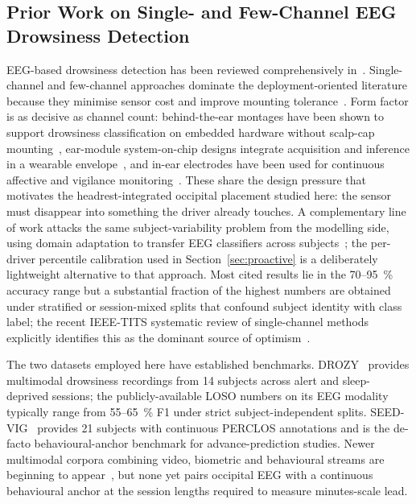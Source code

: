 \documentclass[journal]{IEEEtran}
\DeclareRobustCommand{\add}[1]{#1}                         %
\DeclareRobustCommand{\add}[1]{\hl{#1}}
\begin{document}
\subsection{\add{Prior Work on Single- and Few-Channel EEG Drowsiness Detection}}
\label{sec:related}
EEG-based drowsiness detection has been reviewed comprehensively in~\cite{stancin2021review,sahayadhas2012sensors,chowdhury2018access,balam2024review}. Single-channel and few-channel approaches dominate the deployment-oriented literature because they minimise sensor cost and improve mounting tolerance~\cite{larocco2020headsets,gangadharan2020wireless,minimal2024electrodes}. \add{Form factor is as decisive as channel count: behind-the-ear montages have been shown to support drowsiness classification on embedded hardware without scalp-cap mounting~\mbox{\cite{nguyen2023behindear}}, ear-module system-on-chip designs integrate acquisition and inference in a wearable envelope~\mbox{\cite{ha2016earmodule}}, and in-ear electrodes have been used for continuous affective and vigilance monitoring~\mbox{\cite{athavipach2019inear}}. These share the design pressure that motivates the headrest-integrated occipital placement studied here: the sensor must disappear into something the driver already touches. A complementary line of work attacks the same subject-variability problem from the modelling side, using domain adaptation to transfer EEG classifiers across subjects~\mbox{\cite{maswanganyi2025transfer}}; the per-driver percentile calibration used in Section~\mbox{\ref{sec:proactive}} is a deliberately lightweight alternative to that approach.} Most cited results lie in the 70--95~\% accuracy range but a substantial fraction of the highest numbers are obtained under stratified or session-mixed splits that confound subject identity with class label; the recent IEEE-TITS systematic review of single-channel methods explicitly identifies this as the dominant source of optimism~\cite{balam2024review}.

The two datasets employed here have established benchmarks. DROZY~\cite{drozy2016} provides multimodal drowsiness recordings from 14 subjects across alert and sleep-deprived sessions; the publicly-available LOSO numbers on its EEG modality typically range from 55--65~\% F1 under strict subject-independent splits. SEED-VIG~\cite{zheng2017seedvig} provides 21 subjects with continuous PERCLOS annotations and is the de-facto behavioural-anchor benchmark for advance-prediction studies. \add{Newer multimodal corpora combining video, biometric and behavioural streams are beginning to appear~\mbox{\cite{eeguldd2025}}, but none yet pairs occipital EEG with a continuous behavioural anchor at the session lengths required to measure minutes-scale lead.}
\end{document}
